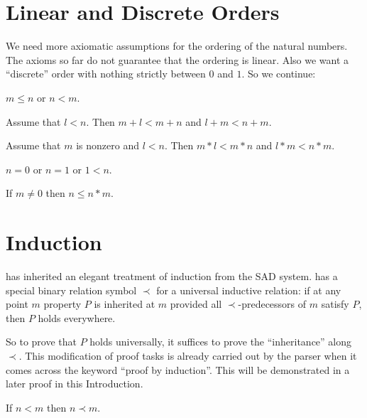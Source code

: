 \documentclass[11pt]{article}
\begin{document}
\section{Linear and Discrete Orders}

We need more axiomatic assumptions for the ordering of the natural numbers. The axioms
so far do not guarantee that the ordering is linear. Also we want
a ``discrete'' order with nothing strictly between 
$0$ and $1$. So we continue:

\begin{forthel}

\begin{axiom} $m \leq n$ or $n < m$.
\end{axiom}

\begin{lemma} Assume that $l < n$.
  Then $m + l < m + n$ and $l + m < n + m$.
\end{lemma}

\begin{lemma} Assume that $m$ is nonzero and $l < n$.
  Then $m * l < m * n$ and $l * m < n * m$.
\end{lemma}

\begin{axiom} $n = 0$ or $n = 1$ or $1 < n$.
\end{axiom}

\begin{lemma} If $m \neq 0$ then $n \leq n * m$.
\end{lemma}
\end{forthel}

\section{Induction}

\Naproche{} has inherited an elegant treatment of induction
from the SAD system. \Naproche{} has a special binary relation
symbol $\prec$ for a universal inductive relation: if at any
point $m$ property $P$ is inherited at $m$ provided all
$\prec$-predecessors of $m$ satisfy $P$, then $P$ holds everywhere.

So to prove that $P$ holds universally, it suffices to prove
the ``inheritance'' along $\prec$. This modification of proof tasks
is already carried out by the parser when it comes across the
keyword ``proof by induction''. This will be demonstrated in a 
later proof in this Introduction.

\begin{forthel}
\begin{axiom} If $n < m$ then $n \prec m$.
\end{axiom}
\end{forthel}
\end{document}
